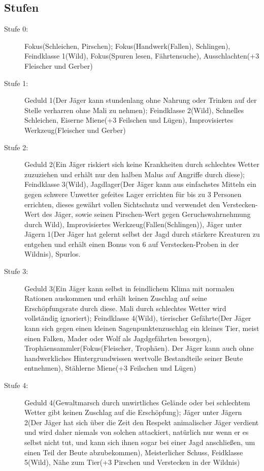\documentclass[a4paper,12pt,oneside]{book}
\begin{document}
\subsection{Stufen}
\begin{description}
\item[Stufe 0:] Fokus(Schleichen, Pirschen); Fokus(Handwerk(Fallen), Schlingen), Feindklasse 1(Wild), Fokus(Spuren lesen, Fährtensuche), Ausschlachten(+3 Fleischer und Gerber)
\item[Stufe 1:] Geduld 1(Der Jäger kann stundenlang ohne Nahrung oder Trinken auf der Stelle verharren ohne Mali zu nehmen); Feindklasse 2(Wild), Schnelles Schleichen, Eiserne Miene(+3 Feilschen und Lügen), Improvisiertes Werkzeug(Fleischer und Gerber)
\item[Stufe 2:] Geduld 2(Ein Jäger riskiert sich keine Krankheiten durch schlechtes Wetter zuzuziehen und erhält nur den halben Malus auf Angriffe durch diese); Feindklasse 3(Wild), Jagdlager(Der Jäger kann aus einfachstes Mitteln ein gegen schwere Unwetter gefeites Lager errichten für bis zu 3 Personen errichten, dieses gewährt vollen Sichtschutz und verwendet den Verstecken-Wert des Jäger, sowie seinen Pirschen-Wert gegen Geruchswahrnehmung durch Wild), Improvisiertes Werkzeug(Fallen(Schlingen)), Jäger unter Jägern 1(Der Jäger hat gelernt selbst der Jagd durch stärkere Kreaturen zu entgehen und erhält einen Bonus von 6 auf Verstecken-Proben in der Wildnis), Spurlos.
\item[Stufe 3:] Geduld 3(Ein Jäger kann selbst in feindlichem Klima mit normalen Rationen auskommen und erhält keinen Zuschlag auf seine Erschöpfungsrate durch diese. Mali durch schlechtes Wetter wird vollständig ignoriert); Feindklasse 4(Wild), tierischer Gefährte(Der Jäger kann sich gegen einen kleinen Sagenpunktenzuschlag ein kleines Tier, meist einen Falken, Mader oder Wolf als Jagdgefährten besorgen), Trophäensammler(Fokus(Fleischer, Trophäen). Der Jäger kann auch ohne handwerkliches Hintergrundwissen wertvolle Bestandteile seiner Beute entnehmen), Stählerne Miene(+3 Feilschen und Lügen)
\item[Stufe 4:] Geduld 4(Gewaltmarsch durch unwirtliches Gelände oder bei schlechtem Wetter gibt keinen Zuschlag auf die Erschöpfung); Jäger unter Jägern 2(Der Jäger hat sich über die Zeit den Respekt animalischer Jäger verdient und wird daher niemals von solchen attackiert, natürlich nur wenn er es selbst nicht tut, und kann sich ihnen sogar bei einer Jagd anschließen, um einen Teil der Beute abzubekommen), Meisterlicher Schuss, Feidklasse 5(Wild), Nähe zum Tier(+3 Pirschen und Verstecken in der Wildnis)
\end{description}
\end{document}
